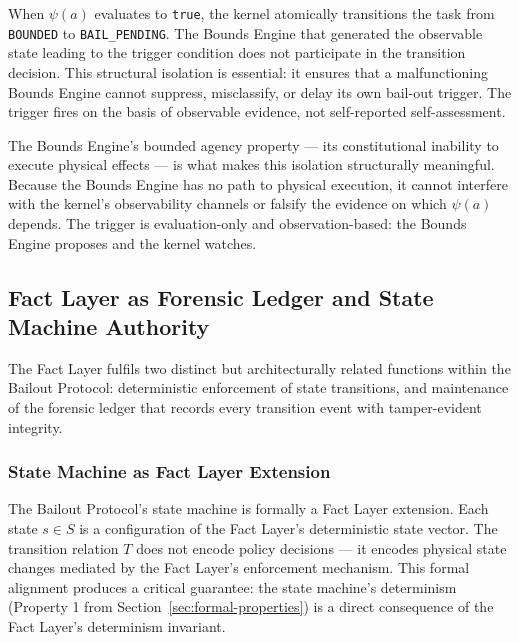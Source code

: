 When $\psi(a)$ evaluates to \texttt{true}, the kernel atomically transitions the task from \texttt{BOUNDED} to \texttt{BAIL\_PENDING}. The Bounds Engine that generated the observable state leading to the trigger condition does not participate in the transition decision. This structural isolation is essential: it ensures that a malfunctioning Bounds Engine cannot suppress, misclassify, or delay its own bail-out trigger. The trigger fires on the basis of observable evidence, not self-reported self-assessment.

The Bounds Engine's bounded agency property — its constitutional inability to execute physical effects — is what makes this isolation structurally meaningful. Because the Bounds Engine has no path to physical execution, it cannot interfere with the kernel's observability channels or falsify the evidence on which $\psi(a)$ depends. The trigger is evaluation-only and observation-based: the Bounds Engine proposes and the kernel watches.

\subsection{Fact Layer as Forensic Ledger and State Machine Authority}
\label{sec:fact-ledger}

The Fact Layer fulfils two distinct but architecturally related functions within the Bailout Protocol: deterministic enforcement of state transitions, and maintenance of the forensic ledger that records every transition event with tamper-evident integrity.

\subsubsection{State Machine as Fact Layer Extension}
\label{sec:state-machine}

The Bailout Protocol's state machine is formally a Fact Layer extension. Each state $s \in S$ is a configuration of the Fact Layer's deterministic state vector. The transition relation $T$ does not encode policy decisions — it encodes physical state changes mediated by the Fact Layer's enforcement mechanism. This formal alignment produces a critical guarantee: the state machine's determinism (Property 1 from Section~\ref{sec:formal-properties}) is a direct consequence of the Fact Layer's determinism invariant.

